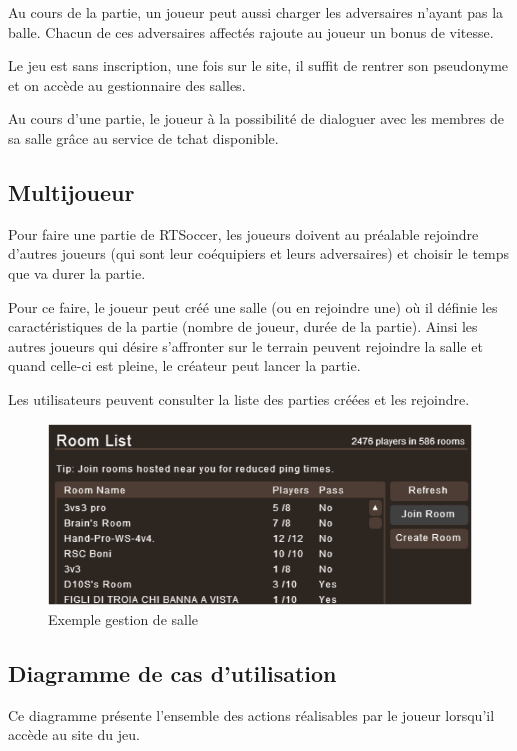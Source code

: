 Au cours de la partie, un joueur peut aussi charger les adversaires n’ayant pas la balle. Chacun de ces adversaires affectés rajoute au joueur un bonus de vitesse.

Le jeu est sans inscription, une fois sur le site, il suffit de rentrer son pseudonyme et on accède au gestionnaire des salles.

Au cours d'une partie, le joueur à la possibilité de dialoguer avec les membres de sa salle grâce au service de tchat disponible.


\subsection{Multijoueur}

Pour faire une partie de RTSoccer, les joueurs doivent au préalable rejoindre d’autres joueurs (qui sont leur coéquipiers et leurs adversaires) et choisir le temps que va durer la partie. 

Pour ce faire, le joueur peut créé une salle (ou en rejoindre une) où il définie les caractéristiques de la partie (nombre de joueur, durée de la partie). 
Ainsi les autres joueurs qui désire s’affronter sur le terrain peuvent rejoindre la salle et quand celle-ci est pleine, le créateur peut lancer la partie. 

Les utilisateurs peuvent consulter la liste des parties créées et les rejoindre.

\begin{figure}[h!]
\centering
\includegraphics[scale=1]{fig2.png}
\caption{Exemple gestion de salle}
\end{figure}

\subsection{Diagramme de cas d'utilisation}

Ce diagramme présente l’ensemble des actions réalisables par le joueur lorsqu’il accède au site du jeu.

